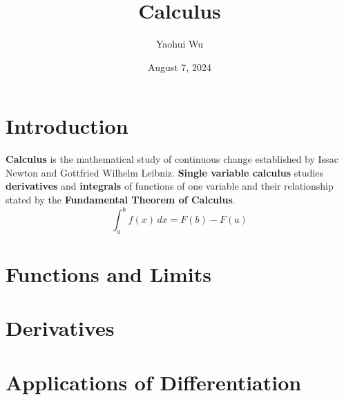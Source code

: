 \documentclass[12pt]{article}
\title{Calculus}
\author{Yaohui Wu}
\date{August 7, 2024}
\begin{document}
\maketitle

\section*{Introduction}

\textbf{Calculus} is the mathematical study of continuous change established
by Issac Newton and Gottfried Wilhelm Leibniz.
\textbf{Single variable calculus} studies \textbf{derivatives} and
\textbf{integrals} of functions of one variable and their relationship stated
by the \textbf{Fundamental Theorem of Calculus}.
\[\int_a^b f(x)\,dx=F(b)-F(a)\]

\tableofcontents
\newpage

\section{Functions and Limits}







\section{Derivatives}













\section{Applications of Differentiation}







\end{document}
